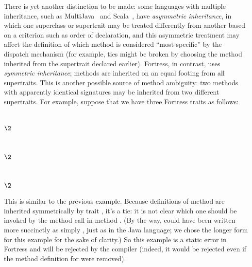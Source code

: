 There is yet another distinction to be made:
some languages with multiple inheritance, such as MultiJava~\cite{MULTIJAVA-OOPSLA-2000,MULTIJAVA-TOPLAS-2006}
and Scala~\cite{SCALA-ABSTRACTIONS},
have \emph{asymmetric inheritance}, in which one superclass or supertrait
may be treated differently from another based on a criterion such
as order of declaration, and this asymmetric treatment may affect
the definition of which method is considered ``most specific''
by the dispatch mechanism (for example, ties might be broken by
choosing the method inherited from the supertrait declared earlier).
Fortress, in contrast, uses \emph{symmetric inheritance}; methods are inherited
on an equal footing from all supertraits.  This is another possible source
of method ambiguity: two methods with apparently identical signatures
may be inherited from two different supertraits.  For example,
suppose that we have three Fortress traits as follows:
\begin{codeexamplesize}
\begin{tabbing}
 \\
\(\2\) \\
 \\[6pt]
 \\
\(\2\) \fortresscommentsep {}\\
 \\[6pt]
 \\
\(\2\) \\
\end{tabbing}
\end{codeexamplesize}
This is similar to the previous example.  Because definitions of method  are
inherited symmetrically by trait , it's a tie: it is not clear which one should be invoked
by the method call  in method .  (By the way,  could
have been written more succinctly as simply , just as in the Java language; we chose the longer
form for this example for the sake of clarity.)  So this example is a static error
in Fortress and will be rejected by the compiler (indeed, it would be rejected even
if the method definition for  were removed).

